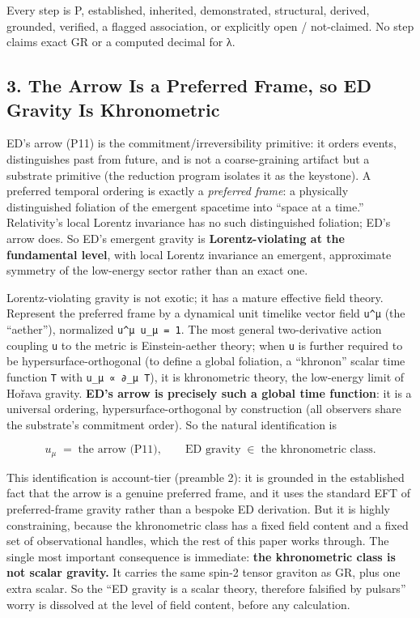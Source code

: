 \documentclass[
]{article}
\begin{document}
Every step is P, established, inherited, demonstrated, structural,
derived, grounded, verified, a flagged association, or explicitly open /
not-claimed. No step claims exact GR or a computed decimal for λ.

\subsection{3. The Arrow Is a Preferred Frame, so ED Gravity Is
Khronometric}\label{the-arrow-is-a-preferred-frame-so-ed-gravity-is-khronometric}

ED's arrow (P11) is the commitment/irreversibility primitive: it orders
events, distinguishes past from future, and is not a coarse-graining
artifact but a substrate primitive (the reduction program isolates it as
the keystone). A preferred temporal ordering is exactly a
\emph{preferred frame}: a physically distinguished foliation of the
emergent spacetime into ``space at a time.'' Relativity's local Lorentz
invariance has no such distinguished foliation; ED's arrow does. So ED's
emergent gravity is \textbf{Lorentz-violating at the fundamental level},
with local Lorentz invariance an emergent, approximate symmetry of the
low-energy sector rather than an exact one.

Lorentz-violating gravity is not exotic; it has a mature effective field
theory. Represent the preferred frame by a dynamical unit timelike
vector field \texttt{u\^{}μ} (the ``aether''), normalized
\texttt{u\^{}μ\ u\_μ\ =\ 1}. The most general two-derivative action
coupling \texttt{u} to the metric is Einstein-aether theory; when
\texttt{u} is further required to be hypersurface-orthogonal (to define
a global foliation, a ``khronon'' scalar time function \texttt{T} with
\texttt{u\_μ\ ∝\ ∂\_μ\ T}), it is khronometric theory, the low-energy
limit of Hořava gravity. \textbf{ED's arrow is precisely such a global
time function}: it is a universal ordering, hypersurface-orthogonal by
construction (all observers share the substrate's commitment order). So
the natural identification is

\[ u_\mu \;=\; \text{the arrow (P11)}, \qquad \text{ED gravity} \;\in\; \text{the khronometric class.} \]

This identification is account-tier (preamble 2): it is grounded in the
established fact that the arrow is a genuine preferred frame, and it
uses the standard EFT of preferred-frame gravity rather than a bespoke
ED derivation. But it is highly constraining, because the khronometric
class has a fixed field content and a fixed set of observational
handles, which the rest of this paper works through. The single most
important consequence is immediate: \textbf{the khronometric class is
not scalar gravity.} It carries the same spin-2 tensor graviton as GR,
plus one extra scalar. So the ``ED gravity is a scalar theory, therefore
falsified by pulsars'' worry is dissolved at the level of field content,
before any calculation.
\end{document}
